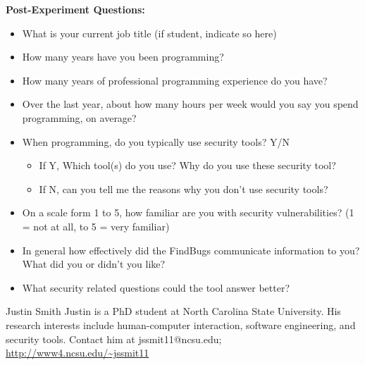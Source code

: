 \documentclass[10pt,journal,compsoc]{IEEEtran}
\begin{document}
\textbf{Post-Experiment Questions:}
\begin{itemize}
\item What is your current job title (if student, indicate so here)
\item How many years have you been programming?
\item How many years of professional programming experience do you have?
\item Over the last year, about how many hours per week would you say you spend programming, on
average?
\item When programming, do you typically use security tools? Y/N
\begin{itemize}
	\item If Y, Which tool(s) do you use? Why do you use these security tool?
	\item If N, can you tell me the reasons why you don't use security tools?
\end{itemize}
\item On a scale form 1 to 5, how familiar are you with security vulnerabilities?
(1 = not at all, to 5 = very familiar)
\item In general how effectively did the FindBugs communicate information to you? What did you or didn’t you like?
\item What security related questions could the tool answer better?
\end{itemize}



%


% 

\begin{IEEEbiography}{Justin Smith}
	Justin is a PhD student at North Carolina State University. His research interests include human-computer interaction, software engineering, and security tools. 
	Contact him at jssmit11@ncsu.edu; 
	\url{http://www4.ncsu.edu/~jssmit11}
\end{IEEEbiography}
\end{document}
